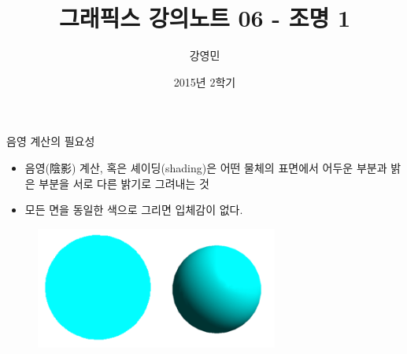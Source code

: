 \documentclass{beamer}
\title[3D 그래픽스 프로그래밍]{그래픽스 강의노트 06 - 조명 1}
\author{강영민}
\institute{동명대학교}
\date{2015년 2학기}
\begin{document}
\begin{frame}
  \titlepage
\end{frame}




%


\begin{frame}[fragile]{음영 계산의 필요성}

\begin{itemize}
\item 음영(陰影) 계산, 혹은 셰이딩(shading)은 어떤 물체의 표면에서 어두운 부분과 밝은 부분을 서로 다른 밝기로 그려내는 것
\item 모든 면을 동일한 색으로 그리면 입체감이 없다.
\end{itemize}

\begin{figure}[h!]
  \centering
    \includegraphics[height=4cm]{OGL_light/shading.png}
\end{figure}

\end{frame}
\end{document}

